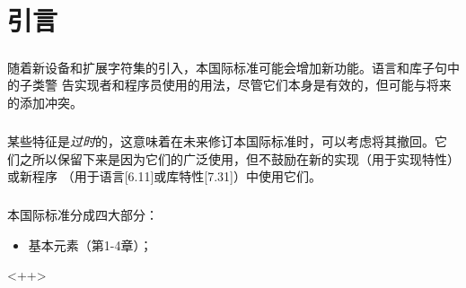 \chapter*{引言}

\setcounter{paragraph}{0}

\paragraph{}
随着新设备和扩展字符集的引入，本国际标准可能会增加新功能。语言和库子句中的子类警
告实现者和程序员使用的用法，尽管它们本身是有效的，但可能与将来的添加冲突。

\paragraph{}
某些特征是\textit{过时}的，这意味着在未来修订本国际标准时，可以考虑将其撤回。它
们之所以保留下来是因为它们的广泛使用，但不鼓励在新的实现（用于实现特性）或新程序
（用于语言[6.11]或库特性[7.31]）中使用它们。

\paragraph{}
本国际标准分成四大部分：
\begin{itemize}
  \item{基本元素（第1-4章）；}
\end{itemize}<++>
